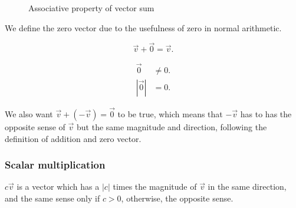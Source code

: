 \begin{figure}[htpb]
    \begin{center}
    \end{center}
    \caption{Associative property of vector sum}%
    \label{fig:vector-sum-associative}
\end{figure}

We define the zero vector due to the usefulness of zero in normal arithmetic.

\begin{definition}
    \[
        \vec{v}+\vec{0}=\vec{v}
    .\]
\end{definition}

\begin{note}
    \begin{align*}
         \vec{0}  & \neq 0. \\
        |\vec{0}| &   =  0.
    \end{align*}
\end{note}

We also want $\vec{v}+(-\vec{v})=\vec{0}$ to be true, which means that $-\vec{v}$ has to has the opposite sense of $\vec{v}$ but the same magnitude and direction, following the definition of addition and zero vector.

\subsubsection{Scalar multiplication}%
\label{ssub:vector-scalar-multiplication}

\begin{definition}
    $c \vec{v}$ is a vector which has a $|c|$ times the magnitude of $\vec{v}$ in the same direction, and the same sense only if $c>0$, otherwise, the opposite sense.
\end{definition}


